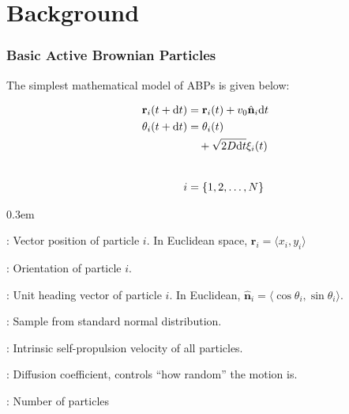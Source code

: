 \documentclass{beamer}
\newcommand{\dt}{\text{d}t}
\begin{document}
\section{Background}
\begin{frame}
    \frametitle{Basic Active Brownian Particles}

    \begin{minipage}[c]{0.4\textwidth}
        \raggedright
        The simplest mathematical model of ABPs is given below:

        \begin{align*}
            \mathbf{r}_i(t + \dt) &= \mathbf{r}_i(t) + v_0 \hat{\mathbf{n}}_i \dt\notag \\
            \theta_i(t + \dt) &= \theta_i(t) \notag\\
            &\quad+ \sqrt{2D\dt} \xi_i (t) \notag 
            \\[22pt]
            i &= \{1,2,\dots, N\} 
        \end{align*}
    \end{minipage}
    \hspace{-5mm}
    \begin{minipage}[c]{0.6\textwidth}
         \begin{description}
                \itemsep0.3em 
                    \item[$\mathbf{r}_i$] : Vector position of particle $i$. In Euclidean space, $\mathbf{r}_i = \langle x_i, y_i \rangle$
                    \item[$\theta_i$] : Orientation of particle $i$.
                    \item[$\hat{\mathbf{n}}_i$] : Unit heading vector of particle $i$. In Euclidean, $\hat{\mathbf{n}}_i = 
                    \langle \cos\theta_i , \sin\theta_i \rangle$. 
                    \item[$\xi_i(t)$] : Sample from standard normal distribution.
                    \item[$v_0$] : Intrinsic self-propulsion velocity of all particles.
                    \item[$D$] : Diffusion coefficient, controls ``how random'' the motion is. 
                    \item[$N$] : Number of particles
            \end{description}
    \end{minipage}
\end{frame}
\end{document}
